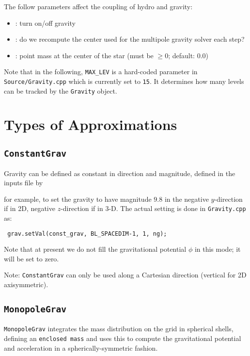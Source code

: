 The follow parameters affect the coupling of hydro and gravity:
\begin{itemize}
\item {} : turn on/off gravity

\item {} : do we recompute the center
   used for the multipole gravity solver each step?

\item {} : point mass at the center of the star
  (must be $\geq 0$; default: 0.0)
\end{itemize}

Note that in the following, {\tt MAX\_LEV} is a hard-coded parameter
in {\tt Source/Gravity.cpp} which is currently set to {\tt 15}.  It
determines how many levels can be tracked by the {\tt Gravity} object.


\section{Types of Approximations}

\subsection{{\tt ConstantGrav}}

Gravity can be defined as constant in direction and magnitude,
defined in the inputs file by


for example, to set the gravity to have magnitude $9.8$ in the
negative $y$-direction if in 2D, negative $z$-direction if in 3-D.
The actual setting is done in {\tt Gravity.cpp} as:
\begin{lstlisting}
 grav.setVal(const_grav, BL_SPACEDIM-1, 1, ng);
\end{lstlisting}

Note that at present we do not fill the gravitational potential $\phi$ in
this mode; it will be set to zero.

Note: {\tt ConstantGrav} can only be used along a Cartesian direction
(vertical for 2D axisymmetric).


\subsection{{\tt MonopoleGrav}}
\label{sec-monopole-grav}

{\tt MonopoleGrav} integrates the mass distribution on the grid
in spherical shells, defining an {\tt enclosed mass} and uses this
to compute the gravitational potential and acceleration in a 
spherically-symmetric fashion.


